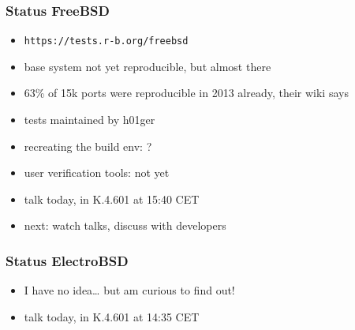 \documentclass[14pt]{beamer}
\begin{document}
\begin{frame}
 \frametitle{Status FreeBSD}
 \begin{itemize}
  \item \texttt{https://tests.r-b.org/freebsd}
  \item base system not yet reproducible, but almost there
  \item 63\% of 15k ports were reproducible in 2013 already, their wiki says
  \item tests maintained by h01ger
  \item recreating the build env: ?
  \item user verification tools: not yet
  \item talk today, in K.4.601 at 15:40 CET
  \item next: watch talks, discuss with developers
 \end{itemize}
\end{frame}

\begin{frame}
 \frametitle{Status ElectroBSD}
 \begin{itemize}
  \item I have no idea… but am curious to find out!
  \item talk today, in K.4.601 at 14:35 CET
 \end{itemize}
\end{frame}
\end{document}
